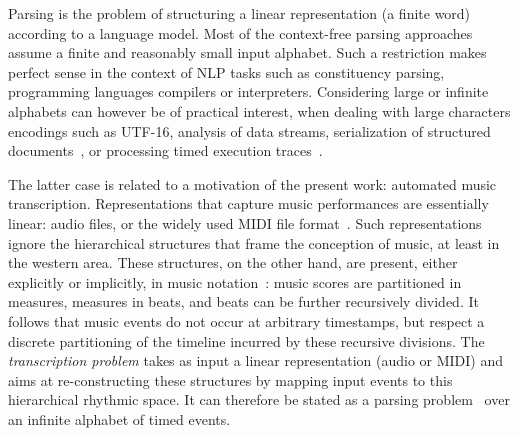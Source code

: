 %
%
Parsing is the problem
of structuring a linear representation
(a finite word) according to a language model. %
%
Most of the context-free parsing approaches~\cite{GruneJacobs08parsing}
assume a finite and reasonably small input alphabet. %
Such a restriction makes perfect sense in the context of
NLP tasks such as constituency parsing,
programming languages compilers or interpreters.
Considering large or infinite alphabets can however be of
practical interest, when dealing with large characters encodings such as UTF-16,
%
analysis of data streams, serialization of structured documents~\cite{Segoufin06csl},
or processing timed execution traces~\cite{Bouyer03algebraic}.
%

The latter case is related to a motivation  of  the present work:
automated music transcription. Representations that capture  music performances
are essentially linear:   
audio files, or the widely used MIDI file format~\cite{?}.
Such representations ignore the hierarchical structures that frame the
conception of music, at least in the western area. These structures, on the other hand,
are present, either explicitly  or implicitly,
in music notation~\cite{Gould11Notation}: music scores are partitioned in measures, measures
in beats, and beats can be further recursively divided.
It follows that music events do not occur at arbitrary timestamps,
but respect a discrete partitioning of the  timeline incurred by
these recursive divisions.
The \emph{transcription problem} takes
as input a linear representation (audio or MIDI) and aims at re-constructing
these structures
by mapping input events to this hierarchical rhythmic space.
It can therefore be stated as a parsing problem~\cite{foscarin:hal-01988990}
over an infinite alphabet of timed events.

